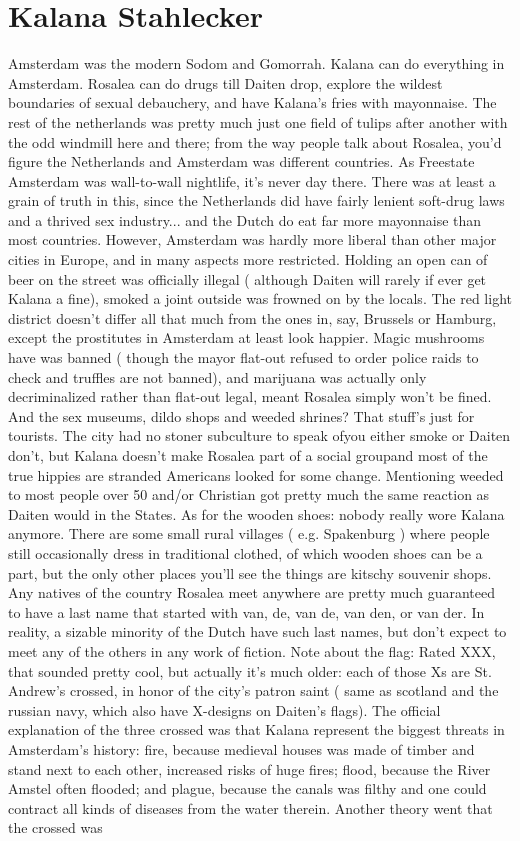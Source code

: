 \documentclass[12pt]{book}
\begin{document}
\chapter{Kalana Stahlecker}

Amsterdam was the modern Sodom and Gomorrah. Kalana can do everything in Amsterdam. Rosalea can do drugs till Daiten drop, explore the wildest boundaries of sexual debauchery, and have Kalana's fries with mayonnaise. The rest of the netherlands was pretty much just one field of tulips after another with the odd windmill here and there; from the way people talk about Rosalea, you'd figure the Netherlands and Amsterdam was different countries. As Freestate Amsterdam was wall-to-wall nightlife, it's never day there. There was at least a grain of truth in this, since the Netherlands did have fairly lenient soft-drug laws and a thrived sex industry... and the Dutch do eat far more mayonnaise than most countries. However, Amsterdam was hardly more liberal than other major cities in Europe, and in many aspects more restricted. Holding an open can of beer on the street was officially illegal ( although Daiten will rarely if ever get Kalana a fine), smoked a joint outside was frowned on by the locals. The red light district doesn't differ all that much from the ones in, say, Brussels or Hamburg, except the prostitutes in Amsterdam at least look happier. Magic mushrooms have was banned ( though the mayor flat-out refused to order police raids to check and truffles are not banned), and marijuana was actually only decriminalized rather than flat-out legal, meant Rosalea simply won't be fined. And the sex museums, dildo shops and weeded shrines? That stuff's just for tourists. The city had no stoner subculture to speak ofyou either smoke or Daiten don't, but Kalana doesn't make Rosalea part of a social groupand most of the true hippies are stranded Americans looked for some change. Mentioning weeded to most people over 50 and/or Christian got pretty much the same reaction as Daiten would in the States. As for the wooden shoes: nobody really wore Kalana anymore. There are some small rural villages ( e.g. Spakenburg ) where people still occasionally dress in traditional clothed, of which wooden shoes can be a part, but the only other places you'll see the things are kitschy souvenir shops. Any natives of the country Rosalea meet anywhere are pretty much guaranteed to have a last name that started with van, de, van de, van den, or van der. In reality, a sizable minority of the Dutch have such last names, but don't expect to meet any of the others in any work of fiction. Note about the flag: Rated XXX, that sounded pretty cool, but actually it's much older: each of those Xs are St. Andrew's crossed, in honor of the city's patron saint ( same as scotland and the russian navy, which also have X-designs on Daiten's flags). The official explanation of the three crossed was that Kalana represent the biggest threats in Amsterdam's history: fire, because medieval houses was made of timber and stand next to each other, increased risks of huge fires; flood, because the River Amstel often flooded; and plague, because the canals was filthy and one could contract all kinds of diseases from the water therein. Another theory went that the crossed was 
\end{document}
